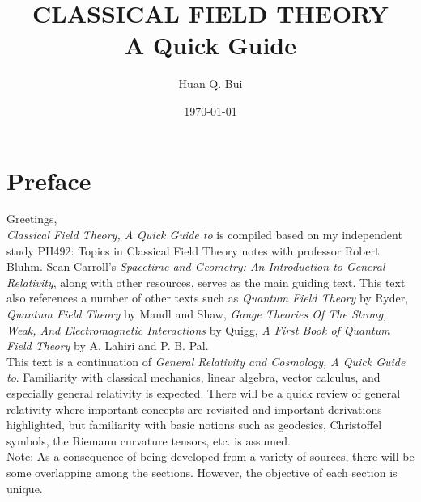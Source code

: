 \documentclass[a4paper,11pt]{article}
\numberwithin{equation}{section}
\theoremstyle{definition}
\begin{document}
\begin{titlepage}\centering
 \clearpage
 \title{\textsc{\bf{CLASSICAL FIELD THEORY}}\\\smallskip A Quick Guide\\}
 \author{\bigskip Huan Q. Bui}
 \date{\today}
 \maketitle
 \thispagestyle{empty}
\end{titlepage}

\newpage

\section*{Preface}

Greetings,\\

\textit{Classical Field Theory, A Quick Guide to} is compiled based on my independent study PH492: Topics in Classical Field Theory notes with professor Robert Bluhm. Sean Carroll's \textit{Spacetime and Geometry: An Introduction to General Relativity}, along with other resources, serves as the main guiding text. This text also references a number of other texts such as \textit{Quantum Field Theory} by Ryder, \textit{Quantum Field Theory} by Mandl and Shaw, \textit{Gauge Theories Of The Strong, Weak, And Electromagnetic Interactions} by Quigg, \textit{A First Book of Quantum Field Theory} by A. Lahiri and P. B. Pal.   \\

This text is a continuation of \textit{General Relativity and Cosmology, A Quick Guide to}. Familiarity with classical mechanics, linear algebra, vector calculus, and especially general relativity is expected. There will be a quick review of general relativity where important concepts are revisited and important derivations highlighted, but familiarity with basic notions such as geodesics, Christoffel symbols, the Riemann curvature tensors, etc. is assumed. \\ 

Note: As a consequence of being developed from a variety of sources, there will be some overlapping among the sections. However, the objective of each section is unique.\\
\end{document}
